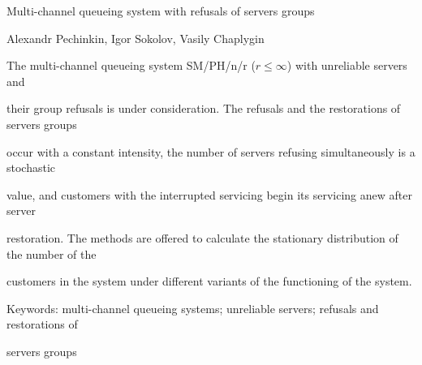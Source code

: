      Multi-channel queueing system with refusals of servers groups


     


     Alexandr Pechinkin, Igor Sokolov, Vasily Chaplygin


     


     The multi-channel queueing system SM/PH/n/r ($r\leq \infty$) with unreliable servers and 


their group refusals is under consideration. The refusals and the restorations of servers groups 


occur with a constant intensity, the number of servers refusing simultaneously is a stochastic 


value, and customers with the interrupted servicing begin its servicing anew after server 


restoration. The methods are offered to calculate the stationary distribution of the number of the 


customers in the system under different variants of the functioning of the system.


     


     Keywords: multi-channel queueing systems; unreliable servers; refusals and restorations of 


servers groups


     


